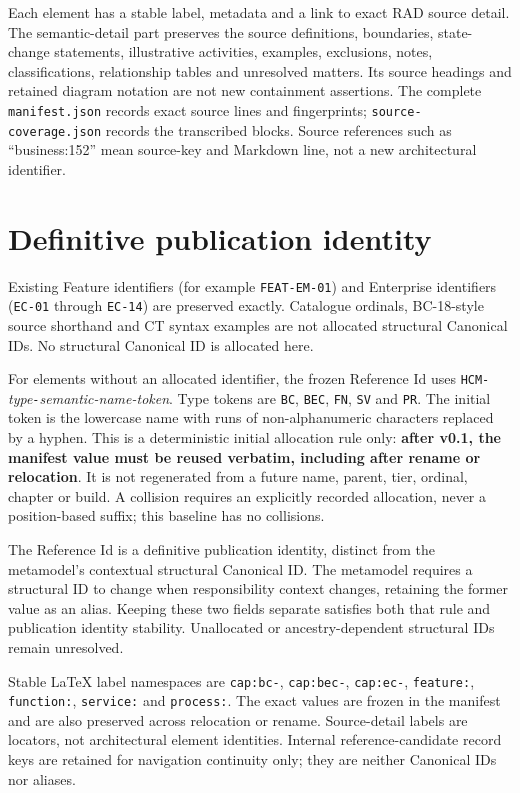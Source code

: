 Each element has a stable label, metadata and a link to exact RAD source detail.
The semantic-detail part preserves the source definitions, boundaries, state-change
statements, illustrative activities, examples, exclusions, notes, classifications,
relationship tables and unresolved matters. Its source headings and retained diagram
notation are not new containment assertions. The complete \texttt{manifest.json}
records exact source lines and fingerprints; \texttt{source-coverage.json} records the
transcribed blocks. Source references such as ``business:152'' mean source-key and
Markdown line, not a new architectural identifier.

\section{Definitive publication identity}

Existing Feature identifiers (for example \texttt{FEAT-EM-01}) and Enterprise
identifiers (\texttt{EC-01} through \texttt{EC-14}) are preserved exactly.
Catalogue ordinals, BC-18-style source shorthand and CT syntax examples are not
allocated structural Canonical IDs. No structural Canonical ID is allocated here.

For elements without an allocated identifier, the frozen Reference Id uses
\texttt{HCM-}\emph{type}\texttt{-}\emph{semantic-name-token}. Type tokens are
\texttt{BC}, \texttt{BEC}, \texttt{FN}, \texttt{SV} and \texttt{PR}.
The initial token is the lowercase name with runs of non-alphanumeric characters
replaced by a hyphen. This is a deterministic initial allocation rule only:
\textbf{after v0.1, the manifest value must be reused verbatim, including after
rename or relocation}. It is not regenerated from a future name, parent, tier,
ordinal, chapter or build. A collision requires an explicitly recorded allocation,
never a position-based suffix; this baseline has no collisions.

The Reference Id is a definitive publication identity, distinct from the metamodel's
contextual structural Canonical ID. The metamodel requires a structural ID to change
when responsibility context changes, retaining the former value as an alias.
Keeping these two fields separate satisfies both that rule and publication identity
stability. Unallocated or ancestry-dependent structural IDs remain unresolved.

Stable LaTeX label namespaces are \texttt{cap:bc-}, \texttt{cap:bec-},
\texttt{cap:ec-}, \texttt{feature:}, \texttt{function:}, \texttt{service:}
and \texttt{process:}. The exact values are frozen in the manifest and are also
preserved across relocation or rename. Source-detail labels are locators, not
architectural element identities. Internal reference-candidate record keys are
retained for navigation continuity only; they are neither Canonical IDs nor aliases.

